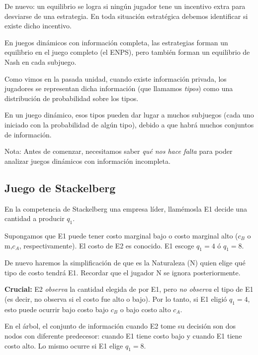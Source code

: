 \documentclass[12pt]{article}
\begin{document}
De nuevo: un equilibrio se logra si ningún jugador tene un incentivo extra para desviarse de una estrategia. En toda situación estratégica debemos identificar si existe dicho incentivo.

En juegos dinámicos con información completa, las estrategias forman un equilibrio en el juego completo (el ENPS), pero también forman un equilibrio de Nash en cada subjuego.


Como vimos en la pasada unidad, cuando existe información privada, los jugadores se representan dicha información (que llamamos \textit{tipos}) como una distribución de probabilidad sobre los tipos.

En un juego dinámico, esos tipos pueden dar lugar a muchos subjuegos (cada uno iniciado con la probabilidad de algún tipo), debido a que habrá muchos conjuntos de información.


\begin{mybox}[colback=red!20]{Nota:}
	Antes de comenzar, necesitamos saber \textit{qué nos hace falta} para poder analizar juegos dinámicos con información incompleta.
\end{mybox}


\subsection{Juego de Stackelberg}

En la competencia de Stackelberg una empresa líder, llamémosla E1 decide una cantidad a producir $ q_1 $.

Supongamos que E1 puede tener costo marginal bajo o costo marginal alto ($ c_B $ o m,$ c_A $, respectivamente). El costo de E2 es conocido. E1 escoge $ q_1=4 $ ó $ q_1=8 $.

De nuevo haremos la simplificación de que es la Naturaleza (N) quien elige qué tipo de costo tendrá E1. Recordar que el jugador N se ignora posteriormente.

\textbf{Crucial:} E2 \textit{observa} la cantidad elegida de por E1, pero \textit{no observa} el tipo de E1 (es decir, no observa si el costo fue alto o bajo). Por lo tanto, si E1 eligió $ q_1=4 $, esto puede ocurrir bajo costo bajo $ c_B $ o bajo costo alto $ c_A $.

En el árbol, el conjunto de información cuando E2 tome su decisión son dos nodos con diferente predecesor: cuando E1 tiene costo bajo y cuando E1 tiene costo alto. Lo mismo ocurre si E1 elige $ q_1=8 $.
\end{document}
